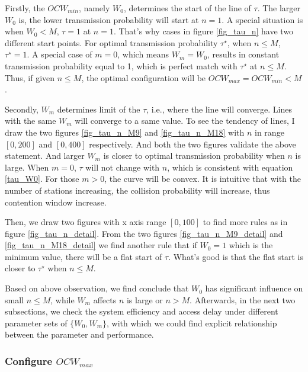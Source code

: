 Firstly, the $OCW_{min}$, namely $W_0$, determines the start of the line of $\tau$. The larger $W_0$ is, the lower transmission probability will start at $n=1$.
A special situation is when $W_0<M$, $\tau=1$ at $n=1$. 
That's why cases in figure \ref{fig_tau_n} have two different start points.
For optimal transmission probability $\tau^\star$, when $n \leq M$, $\tau^\star = 1$. 
A special case of $m=0$, which means $W_m=W_0$, results in constant transmission probability equal to 1, which is perfect match with $\tau^\star$ at $n\leq M$.
Thus, if given $n\leq M$, the optimal configuration will be $OCW_{max}= OCW_{min} < M$. 


Secondly, $W_m$ determines limit of the $\tau$, i.e., where the line will converge. 
Lines with the same $W_m$ will converge to a same value. 
To see the tendency of lines, I draw the two figures \ref{fig_tau_n_M9} and \ref{fig_tau_n_M18} with $n$ in range $[0,200]$ and $[0,400]$ respectively. 
And both the two figures validate the above statement.
And larger $W_m$ is closer to optimal transmission probability when $n$ is large. 
When $m=0$, $\tau$ will not change with $n$, which is consistent with equation \ref{tau_W0}.
For those $m>0$, the curve will be convex. It is intuitive that with the number of stations increasing, the collision probability will increase, thus contention window increase. 




Then, we draw two figures with x axis range $[0,100]$ to find more rules as in figure \ref{fig_tau_n_detail}. 
From the two figures \ref{fig_tau_n_M9_detail} and \ref{fig_tau_n_M18_detail} we find another rule that if $W_0=1$ which is the minimum value, there will be a flat start of $\tau$.
What's good is that the flat start is closer to $\tau^\star$ when $n\leq M$.

Based on above observation, we find conclude that $W_0$ has significant influence on small $n\leq M$, while $W_m$ affects $n$ is large or $n>M$. 
Afterwards, in the next two subsections, we check the system efficiency and access delay under different parameter sets of $\lbrace W_0, W_m \rbrace$, with which we could find explicit relationship between the parameter and performance.




\subsubsection{Configure $OCW_{max}$}

